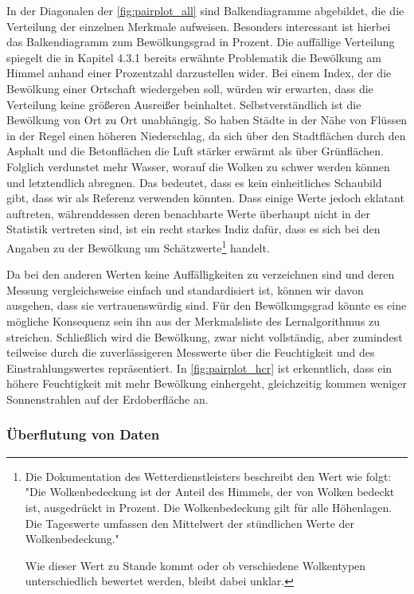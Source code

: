 \documentclass[12pt, a4paper]{article}
\begin{document}
In der Diagonalen der \autoref{fig:pairplot_all} sind Balkendiagramme abgebildet, die die Verteilung der einzelnen Merkmale aufweisen. Besonders interessant ist hierbei das Balkendiagramm zum Bewölkungsgrad in Prozent. Die auffällige Verteilung spiegelt die in Kapitel 4.3.1 bereits erwähnte Problematik die Bewölkung am Himmel anhand einer Prozentzahl darzustellen wider. Bei einem Index, der die Bewölkung einer Ortschaft wiedergeben soll, würden wir erwarten, dass die Verteilung keine größeren Ausreißer beinhaltet. Selbstverständlich ist die Bewölkung von Ort zu Ort unabhängig. So haben Städte in der Nähe von Flüssen in der Regel einen höheren Niederschlag, da sich über den Stadtflächen durch den Asphalt und die Betonflächen die Luft stärker erwärmt als über Grünflächen. Folglich verdunstet mehr Wasser, worauf die Wolken zu schwer werden können und letztendlich abregnen. Das bedeutet, dass es kein einheitliches Schaubild gibt, dass wir als Referenz verwenden könnten. Dass einige Werte jedoch eklatant auftreten, währenddessen deren benachbarte Werte überhaupt nicht in der Statistik vertreten sind, ist ein recht starkes Indiz dafür, dass es sich bei den Angaben zu der Bewölkung um Schätzwerte\footnote{Die Dokumentation des Wetterdienstleisters beschreibt den Wert wie folgt: "Die Wolkenbedeckung ist der Anteil des Himmels, der von Wolken bedeckt ist, ausgedrückt in Prozent. Die Wolkenbedeckung gilt für alle Höhenlagen. Die Tageswerte umfassen den Mittelwert der stündlichen Werte der Wolkenbedeckung."

Wie dieser Wert zu Stande kommt oder ob verschiedene Wolkentypen unterschiedlich bewertet werden, bleibt dabei unklar.} handelt.

Da bei den anderen Werten keine Auffälligkeiten zu verzeichnen sind und deren Messung vergleichsweise einfach und standardisiert ist, können wir davon ausgehen, dass sie vertrauenswürdig sind. Für den Bewölkungsgrad könnte es eine mögliche Konsequenz sein ihn aus der Merkmalsliste des Lernalgorithmus zu streichen. Schließlich wird die Bewölkung, zwar nicht vollständig, aber zumindest teilweise durch die zuverlässigeren Messwerte über die Feuchtigkeit und des Einstrahlungswertes repräsentiert. In \autoref{fig:pairplot_hcr} ist erkenntlich, dass ein höhere Feuchtigkeit mit mehr Bewölkung einhergeht, gleichzeitig kommen weniger Sonnenstrahlen auf der Erdoberfläche an. 

\subsubsection{Überflutung von Daten}
\end{document}
